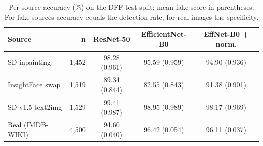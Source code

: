 \begin{table}[!t]
\centering
\caption{Per-source accuracy (\%) on the DFF test split; mean fake score in parentheses. For fake sources accuracy equals the detection rate, for real images the specificity.}
\label{tab:per_method_dff}
\setlength{\tabcolsep}{3pt}
\begin{tabular}{lrccc}
\toprule
Source & n & ResNet-50 & EfficientNet-B0 & EffNet-B0 + norm. \\
\midrule
SD inpainting & 1,452 & 98.28 (0.961) & 95.59 (0.959) & 94.90 (0.936) \\
InsightFace swap & 1,519 & 89.34 (0.844) & 82.55 (0.843) & 91.38 (0.901) \\
SD v1.5 text2img & 1,529 & 99.41 (0.987) & 98.95 (0.989) & 98.17 (0.969) \\
Real (IMDB-WIKI) & 4,500 & 94.60 (0.040) & 96.42 (0.054) & 96.11 (0.037) \\
\bottomrule
\end{tabular}
\end{table}
